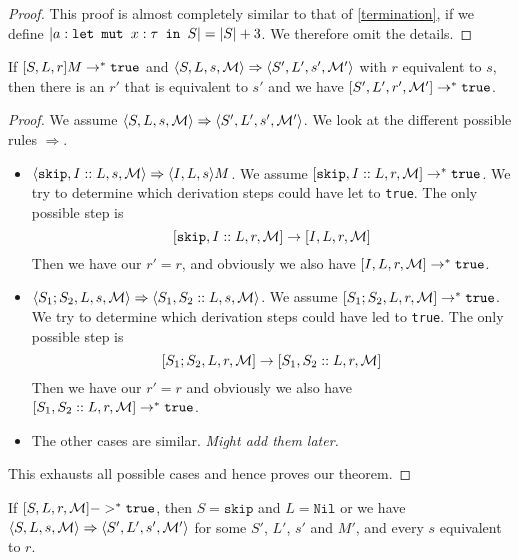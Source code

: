 \begin{proof}
This proof is almost completely similar to that of \ref{termination}, if we define $|a : \texttt{let mut }x : \tau \texttt{ in } S| = |S| + 3$. We therefore omit the details.
\end{proof}


\begin{theorem}
\label{preservationb}
If $[ S, L, r ]{M} \to ^* \texttt{true}$ and $\langle S, L, s, \mathcal{M} \rangle \Rightarrow \langle S', L', s', \mathcal{M'} \rangle$ with $r$ equivalent to $s$, then there is an $r'$ that is equivalent to $s'$ and we have $[ S', L', r', \mathcal{M'} ] \to ^* \texttt{true}$.
\end{theorem}

\begin{proof}
We assume $\langle S, L, s, \mathcal{M} \rangle \Rightarrow \langle S', L', s', \mathcal{M'} \rangle$. We look at the different possible rules $\Rightarrow$. 
\begin{itemize}[noitemsep]
    \item $\langle \texttt{skip}, I::L, s, \mathcal{M} \rangle \Rightarrow \langle I, L, s \rangle{M}$. We assume $[ \texttt{skip}, I::L, r, \mathcal{M} ] \to ^* \texttt{true}$. We try to determine which derivation steps could have let to \texttt{true}. The only possible step is 
    $$[ \texttt{skip}, I::L, r, \mathcal{M} ]\to [ I, L, r, \mathcal{M} ]$$
    Then we have our $r' = r$, and obviously we also have $[ I, L, r, \mathcal{M} ] \to^* \texttt{true}$.
    \item $\langle S_1; S_2, L, s, \mathcal{M} \rangle \Rightarrow \langle S_1, S_2::L, s, \mathcal{M} \rangle$. We assume $[ S_1; S_2, L, r, \mathcal{M} ] \to ^* \texttt{true}$. We try to determine which derivation steps could have led to \texttt{true}. The only possible step is 
    $$[ S_1; S_2, L, r, \mathcal{M} ] \to [ S_1, S_2::L, r, \mathcal{M} ]$$
    Then we have our $r' = r$ and obviously we also have $[ S_1, S_2::L, r, \mathcal{M} ] \to^* \texttt{true}$.
    \item The other cases are similar. \emph{Might add them later.}
\end{itemize}
This exhausts all possible cases and hence proves our theorem.
\end{proof}


\begin{theorem}
\label{progressb}
If $[ S, L, r, \mathcal{M} ] ->^* \texttt{true}$, then $S = \texttt{skip}$ and $L = \texttt{Nil}$ or we have $\langle S, L, s, \mathcal{M} \rangle \Rightarrow \langle S', L', s', \mathcal{M'} \rangle$ for some $S'$, $L'$, $s'$ and $M'$, and every $s$ equivalent to $r$.
\end{theorem}

